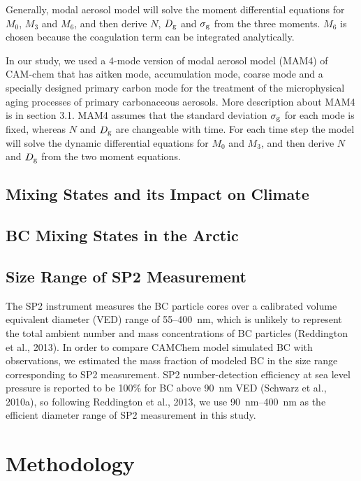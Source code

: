 \documentclass[12pt]{article}
\begin{document}
	
	
	\newpage
	Generally, modal aerosol model will solve the moment differential equations for $M_0$, $M_3$ and $M_6$, and then derive $N$, $D_{\rm g}$ and $\sigma_{\rm g}$ from the three moments. $M_6$ is chosen because the coagulation term can be integrated analytically. 
	
	In our study, we used a 4-mode version of modal aerosol model (MAM4) of CAM-chem that has aitken mode, accumulation mode, coarse mode and a specially designed primary carbon mode for the treatment of the microphysical aging processes of primary carbonaceous aerosols. More description about MAM4 is in section 3.1. MAM4 assumes that the standard deviation $\sigma_{\rm g}$ for each mode is fixed, whereas $N$ and $D_{\rm g}$ are changeable with time. For each time step the model will solve the dynamic differential equations for $M_0$ and $M_3$, and then derive $N$ and $D_{\rm g}$ from the two moment equations.
	
	\subsection{Mixing States and its Impact on Climate}
	
	\subsection{BC Mixing States in the Arctic}
	
	\subsection{Size Range of SP2 Measurement}
		The SP2 instrument measures the BC particle cores over a calibrated volume equivalent diameter (VED) range of 55--400~nm, which is unlikely to represent the total
		ambient number and mass concentrations of BC particles (Reddington et al., 2013). In order to compare CAMChem model simulated BC with observations, we estimated the mass fraction of modeled BC in the size range corresponding to SP2 measurement. SP2 number-detection efficiency at sea level pressure is reported to be 100$\%$ for BC above 90~nm VED (Schwarz et al., 2010a), so following Reddington et al., 2013, we use 90~nm--400~nm as the efficient diameter range of SP2 measurement in this study.
	
	\section{Methodology}
\end{document}
